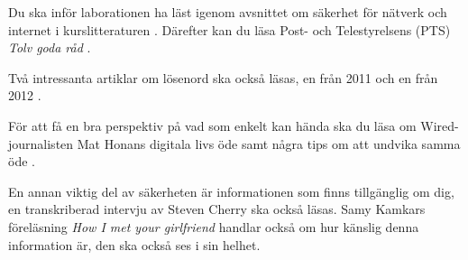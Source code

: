 Du ska inför laborationen ha läst igenom avsnittet om säkerhet för nätverk och 
internet i kurslitteraturen \citep[avsnitt 4.5]{Brookshear2012csa}.
Därefter kan du läsa Post- och Telestyrelsens (PTS) \emph{Tolv goda råd} 
\citep{PTStgr}.

Två intressanta artiklar om lösenord ska också läsas, en från 2011 
\citep{Hunt2011abs} och en från 2012 \citep{Cluley2012twp}.

För att få en bra perspektiv på vad som enkelt kan hända ska du läsa om 
Wired-journalisten Mat Honans digitala livs öde \citep{Honan2012haa} samt några 
tips om att undvika samma öde \citep{Zetter2012hnt}.

En annan viktig del av säkerheten är informationen som finns tillgänglig om 
dig, en transkriberad intervju av Steven Cherry \citep{Cherry2012fky} ska också 
läsas.
Samy Kamkars föreläsning \emph{How I met your girlfriend} \citep{Kamkar2010him} 
handlar också om hur känslig denna information är, den ska också ses i sin 
helhet.
